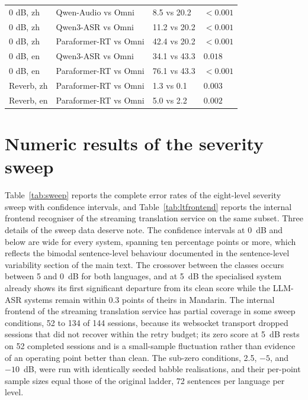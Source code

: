 \documentclass[11pt]{article}
\begin{document}
\begin{table}[h]
\begin{tabular}{llll}
0 dB, zh & Qwen-Audio vs Omni & 8.5 vs 20.2 & $<0.001$ \\
0 dB, zh & Qwen3-ASR vs Omni & 11.2 vs 20.2 & $<0.001$ \\
0 dB, zh & Paraformer-RT vs Omni & 42.4 vs 20.2 & $<0.001$ \\
0 dB, en & Qwen3-ASR vs Omni & 34.1 vs 43.3 & $0.018$ \\
0 dB, en & Paraformer-RT vs Omni & 76.1 vs 43.3 & $<0.001$ \\
Reverb, zh & Paraformer-RT vs Omni & 1.3 vs 0.1 & $0.003$ \\
Reverb, en & Paraformer-RT vs Omni & 5.0 vs 2.2 & $0.002$ \\
\bottomrule
\end{tabular}
\end{table}

\section{Numeric results of the severity sweep}
\label{supp:sweep}

Table~\ref{tab:sweep} reports the complete error rates of the eight-level
severity sweep with confidence intervals, and Table~\ref{tab:ltfrontend}
reports the internal frontend recogniser of the streaming translation
service on the same subset. Three details of the sweep data deserve note.
The confidence intervals at 0~dB and below are wide for every system,
spanning ten percentage points or more, which reflects the bimodal
sentence-level behaviour documented in the sentence-level variability
section of the main text. The crossover between the classes occurs between
5 and 0~dB for both languages, and at 5~dB the specialised system already
shows its first significant departure from its clean score while the
LLM-ASR systems remain within 0.3 points of theirs in Mandarin. The
internal frontend of the streaming translation service has partial
coverage in some sweep conditions, 52 to 134 of 144 sessions, because its
websocket transport dropped sessions that did not recover within the
retry budget; its zero score at 5~dB rests on 52 completed sessions and is
a small-sample fluctuation rather than evidence of an operating point
better than clean. The sub-zero conditions, 2.5, $-5$, and $-10$~dB, were
run with identically seeded babble realisations, and their per-point
sample sizes equal those of the original ladder, 72 sentences per language
per level.
\end{document}
